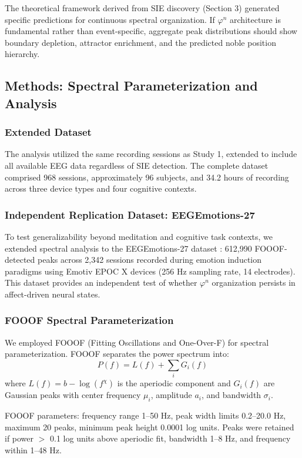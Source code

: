 \documentclass[11pt,a4paper]{article}
\newcommand{\phisym}{\varphi}
\begin{document}
The theoretical framework derived from SIE discovery (Section 3) generated specific predictions for continuous spectral organization. If $\phisym^n$ architecture is fundamental rather than event-specific, aggregate peak distributions should show boundary depletion, attractor enrichment, and the predicted noble position hierarchy.

\subsection{Methods: Spectral Parameterization and Analysis}

\subsubsection{Extended Dataset}
The analysis utilized the same recording sessions as Study 1, extended to include all available EEG data regardless of SIE detection. The complete dataset comprised 968 sessions, approximately 96 subjects, and 34.2 hours of recording across three device types and four cognitive contexts.

\subsubsection{Independent Replication Dataset: EEGEmotions-27}
To test generalizability beyond meditation and cognitive task contexts, we extended spectral analysis to the EEGEmotions-27 dataset \parencite{huy2025eeg}: 612,990 FOOOF-detected peaks across 2,342 sessions recorded during emotion induction paradigms using Emotiv EPOC X devices (256 Hz sampling rate, 14 electrodes). This dataset provides an independent test of whether $\phisym^n$ organization persists in affect-driven neural states.

\subsubsection{FOOOF Spectral Parameterization}
We employed FOOOF (Fitting Oscillations and One-Over-F) \parencite{donoghue2020fooof} for spectral parameterization. FOOOF separates the power spectrum into:
\begin{equation}
P(f) = L(f) + \sum_{i} G_i(f)
\end{equation}
where $L(f) = b - \log(f^\chi)$ is the aperiodic component and $G_i(f)$ are Gaussian peaks with center frequency $\mu_i$, amplitude $a_i$, and bandwidth $\sigma_i$.

FOOOF parameters: frequency range 1--50 Hz, peak width limits 0.2--20.0 Hz, maximum 20 peaks, minimum peak height 0.0001 log units. Peaks were retained if power $>$ 0.1 log units above aperiodic fit, bandwidth 1--8 Hz, and frequency within 1--48 Hz.
\end{document}
